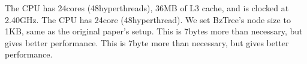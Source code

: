 The CPU has 24cores (48hyperthreads), 36MB of L3 cache, and is clocked at 2.40GHz.
The CPU has 24core (48hyperthread).
We set BzTree’s node size to 1KB, same as the original paper’s setup. 
This is 7bytes more than necessary, but gives better performance. 
This is 7byte more than necessary, but gives better performance. 